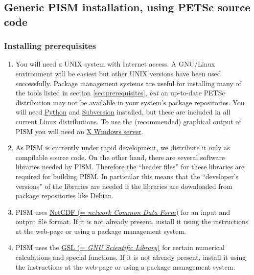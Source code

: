 \documentclass[11pt,final]{amsart}
\begin{document}
\vspace{0.3in}

\newpage
\subsection{Generic PISM installation, using PETSc source code}\label{subsec:generic}

\subsubsection{Installing prerequisites}
\renewcommand{\labelenumi}{\textbf{\arabic{enumi}.}~}
\begin{enumerate}
\item You will need a UNIX system with Internet access. A GNU/Linux environment will be easiest but other UNIX versions have been
  used successfully. Package management systems are useful for installing many of the tools listed in section
  \ref{sec:prerequisites}, \emph{but} an up-to-date PETSc distribution may not be available in your system's package
  repositories. You will need \href{http://www.python.org/}{Python} and \href{http://subversion.tigris.org/}{Subversion}
  installed, but these are included in all current Linux distributions. To use the (recommended) graphical output of PISM you will
  need an \href{http://www.x.org/}{X Windows server}.

\item As PISM is currently under rapid development, we distribute it only as compilable source code. On the other hand, there are
  several software libraries needed by PISM. Therefore the ``header files'' for these libraries are required for building PISM. In
  particular this means that the ``developer's versions'' of the libraries are needed if the libraries are downloaded from package
  repositories like Debian.

\item PISM uses \href{http://www.unidata.ucar.edu/software/netcdf/}{NetCDF (= \emph{network Common Data Form})} for
  an input and output file format. If it is not already present, install it using the instructions at the web-page or using a
  package management system.

\item PISM uses the \href{http://www.gnu.org/software/gsl/}{GSL (= \emph{GNU Scientific Library})} for certain numerical calculations and special functions. If it is not already present, install it using the
  instructions at the web-page or using a package management system.


\end{enumerate}
\end{document}
